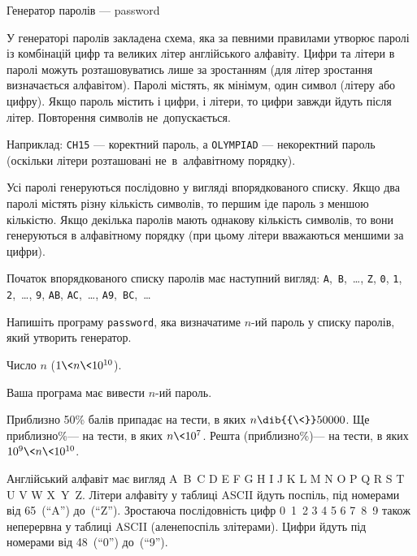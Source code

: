 \begin{problemAllDefault}{Генератор паролів --- password}

\label{label:201415-3-C-start}

У генераторі паролів закладена схема, яка за певними правилами утворює паролі із комбінацій цифр та великих літер англійського алфавіту. Цифри та літери в паролі можуть розташовуватись лише за зростанням (для літер зростання визначається алфавітом). Паролі містять, як мінімум, один символ (літеру або цифру). Якщо пароль містить і цифри, і літери, то цифри завжди йдуть після літер. Повторення символів не~допускається.

Наприклад: \texttt{CH15} --- коректний пароль, а \texttt{OLYMPIAD} --- некоректний пароль (оскільки літери розташовані не~в~алфавітному порядку).

Усі паролі генеруються послідовно у вигляді впорядкованого списку. Якщо два паролі містять різну кількість символів, то першим іде пароль з меншою кількістю. Якщо декілька паролів мають однакову кількість символів, то вони генеруються в алфавітному порядку (при цьому літери вважаються меншими за цифри).

Початок впорядкованого списку паролів має наступний вигляд: \texttt{A},~\texttt{B},~\dots, \texttt{Z}, \texttt{0}, \texttt{1}, \texttt{2},~\dots, \texttt{9}, \texttt{AB}, \texttt{AC},~\dots, \texttt{A9},~\texttt{BC},~\dots 

\Task Напишіть програму \texttt{password}, яка визначатиме $n$-ий пароль у списку паролів, який утворить генератор.

\InputFile Число $n$ ($1\<n\<10^{10}$).

\OutputFile Ваша програма має вивести $n$-ий пароль.

\Examples
\begin{exampleSimple}{2em}{2em}%
%
%
\end{exampleSimple}

\Scoring Приблизно 50\% балів припадає на тести, в яких $n\dib{{\<}}50000$. Ще приблизно\%\nolinebreak[3] --- на тести, в яких $n\<10^7$. Решта (приблизно\%)\nolinebreak[3] --- на тести, в яких $10^9 \< n \< 10^{10}$.


\Note Англійський алфавіт має вигляд A~B~C D E F G H I J K L M N O P Q R S T U V W X~Y~Z. Літери алфавіту у таблиці ASCII йдуть поспіль, під номерами від 65~(``A'') до~(``Z''). Зростаюча послідовність цифр 0~1~2 3 4 5 6 7~8~9 також неперервна у таблиці ASCII (але\nolinebreak[3] не\nolinebreak[2] поспіль з\nolinebreak[3] літерами). Цифри йдуть під номерами від 48~(``0'') до~(``9'').


\end{problemAllDefault}
